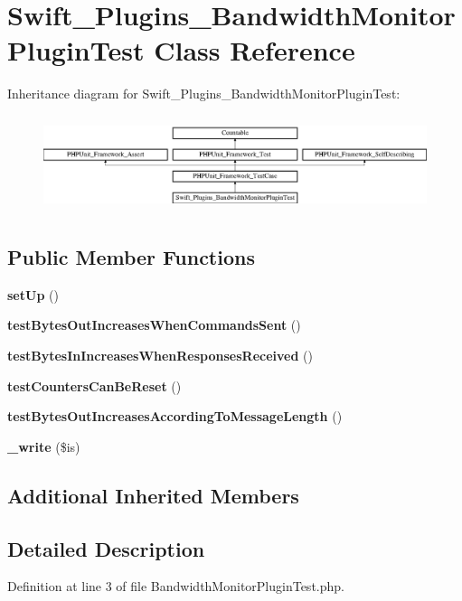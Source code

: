 \section{Swift\+\_\+\+Plugins\+\_\+\+Bandwidth\+Monitor\+Plugin\+Test Class Reference}
\label{class_swift___plugins___bandwidth_monitor_plugin_test}
Inheritance diagram for Swift\+\_\+\+Plugins\+\_\+\+Bandwidth\+Monitor\+Plugin\+Test\+:\begin{figure}[H]
\begin{center}
\leavevmode
\includegraphics[height=2.860792cm]{class_swift___plugins___bandwidth_monitor_plugin_test}
\end{center}
\end{figure}
\subsection*{Public Member Functions}
\begin{DoxyCompactItemize}
\item 
{\bf set\+Up} ()
\item 
{\bf test\+Bytes\+Out\+Increases\+When\+Commands\+Sent} ()
\item 
{\bf test\+Bytes\+In\+Increases\+When\+Responses\+Received} ()
\item 
{\bf test\+Counters\+Can\+Be\+Reset} ()
\item 
{\bf test\+Bytes\+Out\+Increases\+According\+To\+Message\+Length} ()
\item 
{\bf \+\_\+write} (\$is)
\end{DoxyCompactItemize}
\subsection*{Additional Inherited Members}


\subsection{Detailed Description}


Definition at line 3 of file Bandwidth\+Monitor\+Plugin\+Test.\+php.



